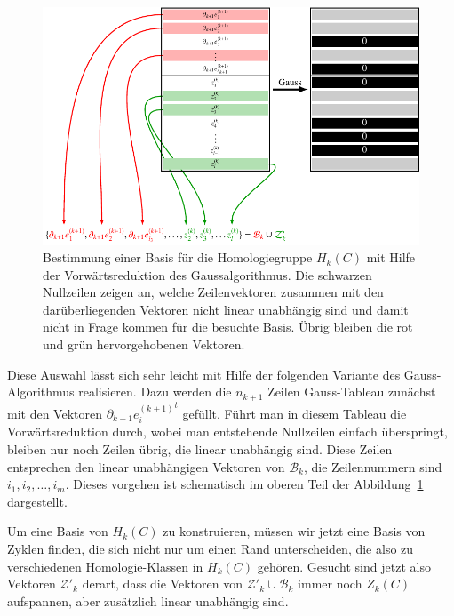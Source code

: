 \begin{figure}
\centering
\includegraphics{chapters/95-homologie/images/gausshomobasis.pdf}
\caption{Bestimmung einer Basis für die Homologiegruppe $H_k(C)$ mit
Hilfe der Vorwärtsreduktion des Gaussalgorithmus.
Die schwarzen Nullzeilen zeigen an, welche Zeilenvektoren zusammen mit
den darüberliegenden Vektoren nicht linear unabhängig sind und damit nicht
in Frage kommen für die besuchte Basis.
Übrig bleiben die {\color{red}rot} und {\color{darkgreen}grün} hervorgehobenen
Vektoren.
\label{buch:homologie:fig:gausshomobasis}}
\end{figure}

Diese Auswahl lässt sich sehr leicht mit Hilfe der folgenden
Variante des Gauss-Algorithmus realisieren.
Dazu werden die $n_{k+1}$ Zeilen Gauss-Tableau zunächst mit den Vektoren
$\partial_{k+1}{e_i^{(k+1)}}^t$ gefüllt.
Führt man in diesem Tableau die Vorwärtsreduktion durch, wobei man
entstehende Nullzeilen einfach überspringt, bleiben nur noch Zeilen
übrig, die linear unabhängig sind.
Diese Zeilen entsprechen den linear unabhängigen Vektoren von $\mathcal{B}_k$,
die Zeilennummern sind $i_1,i_2,\dots,i_m$.
Dieses vorgehen ist schematisch im oberen Teil der
Abbildung~\ref{buch:homologie:fig:gausshomobasis} dargestellt.

Um eine Basis von $H_k(C)$ zu konstruieren, müssen wir jetzt eine
Basis von Zyklen finden, die sich nicht nur um einen Rand unterscheiden,
die also zu verschiedenen Homologie-Klassen in $H_k(C)$ gehören.
Gesucht sind jetzt also Vektoren $\mathcal{Z}'_k$ derart, dass 
die Vektoren von $\mathcal{Z}'_k\cup\mathcal{B}_k$ immer noch $Z_k(C)$
aufspannen, aber zusätzlich linear unabhängig sind.

